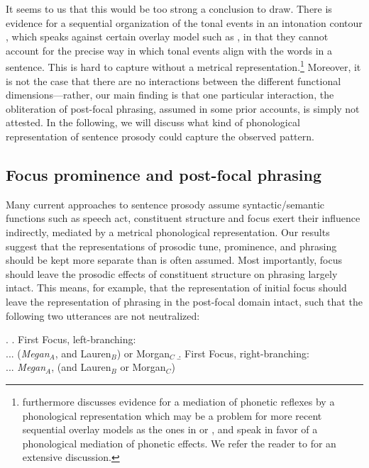 \documentclass[preprint,review,12pt,authoryear,times]{elsarticle}
\begin{document}
It seems to us that this would be too strong a conclusion to draw. There is evidence for a sequential organization of the tonal events in an intonation contour \citep{ladd08}, which speaks against certain overlay model such as  \citet{fujis81}, in that they cannot account for the precise way in which tonal events align with the words in a sentence. This is hard to capture without a metrical representation.\footnote{\citet{ladd08} furthermore discusses evidence for a  mediation of phonetic reflexes by a phonological representation which may be a problem for more recent sequential overlay models as the ones in \citet{mobiu93} or \citet{xu05}, and speak in favor of a phonological mediation of phonetic effects.  We refer the reader to \citet{ladd08} for an extensive discussion.} Moreover, it is not the case that there are no interactions between the different functional dimensions---rather, our main finding is that one particular interaction, the obliteration of post-focal phrasing, assumed in some prior accounts, is simply not attested. In the following, we will discuss what kind of phonological representation of sentence prosody could capture the observed pattern. 


\subsection{Focus prominence and post-focal phrasing}

Many current approaches to sentence prosody assume syntactic/semantic functions such as speech act, constituent structure and focus exert their influence indirectly, mediated by a metrical phonological representation. Our results suggest that the representations of prosodic tune, prominence, and phrasing should be kept more separate than is often assumed. Most importantly, focus should leave the prosodic effects of constituent structure on phrasing largely intact. This means, for example, that the representation of initial focus  should leave the representation of phrasing in the post-focal domain intact, such that the following two utterances are not neutralized:

\ex.\label{firstphra}
\a. First Focus, left-branching:\\
... ({\em Megan}$_A$, and Lauren$_B$) or Morgan$_C$\label{firstle}
\b. First Focus, right-branching:\\
 ... {\em Megan}$_A$, (and {Lauren}$_B$ or Morgan$_C$)\label{firstri}
 
\end{document}
